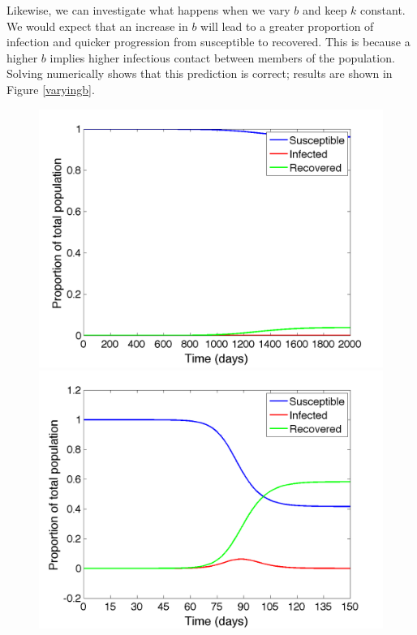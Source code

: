 \documentclass{article}
\begin{document}
Likewise, we can investigate what happens when we vary $b$ and keep $k$ constant. We would expect that an increase in $b$ will lead to a greater proportion of infection and quicker progression from susceptible to recovered.   This is because a higher $b$ implies higher infectious contact between members of the population.  Solving numerically shows that this prediction is correct; results are shown in Figure \ref{varyingb}.  
\begin{figure}[h!]
\centering
\begin{minipage}{.32\textwidth}
  \centering
  \includegraphics[width=\linewidth]{b034k033333}
\end{minipage}%
\begin{minipage}{.32\textwidth}
  \centering
  \includegraphics[width=\linewidth]{b05k033333}

\end{minipage}
\end{figure}
\end{document}

